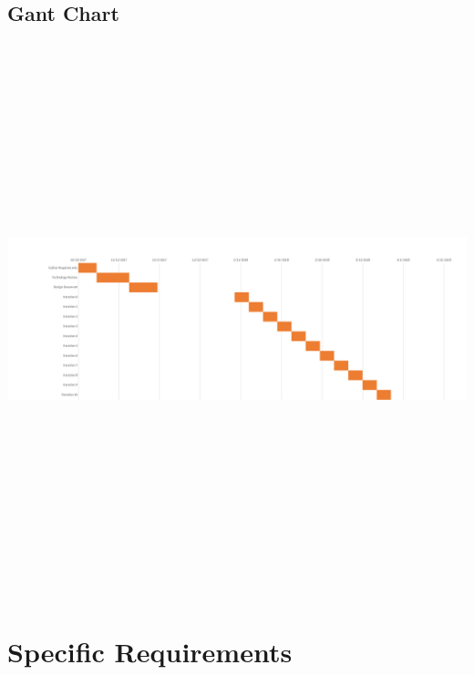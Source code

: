 \documentclass[onecolumn, draftclsnofoot,10pt, compsoc]{IEEEtran}
\begin{document}
		\subsection*{Gant Chart}
		\includegraphics[height=16cm,natwidth=1664,natheight=592]{Gant.png}


	\section*{Specific Requirements}
\end{document}

